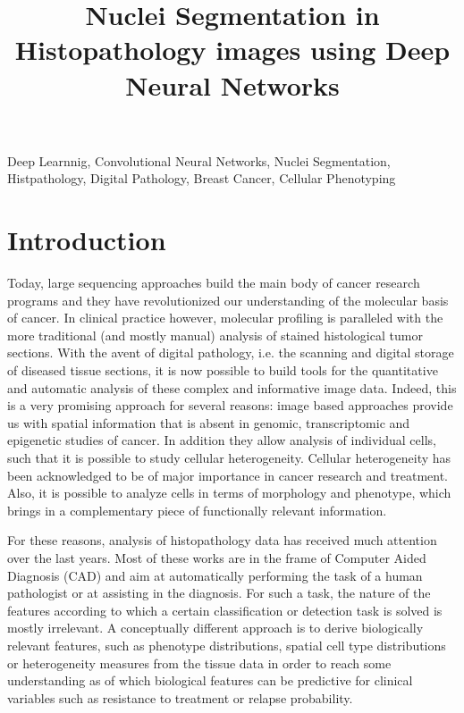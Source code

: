 \documentclass{article}
\title{Nuclei Segmentation in Histopathology
  images using Deep Neural Networks}
\begin{document}
%
\maketitle
%
\begin{abstract}
\end{abstract}
%
\begin{keywords}
Deep Learnnig, Convolutional Neural Networks, Nuclei Segmentation,
Histpathology, Digital Pathology, Breast Cancer, Cellular Phenotyping
\end{keywords}
%
\section{Introduction}
\label{sec:intro}

Today, large sequencing approaches build the main body of cancer
research programs and they have revolutionized our understanding of
the molecular basis of cancer. In clinical practice however,
molecular profiling is paralleled with the more traditional
(and mostly manual) analysis of stained histological tumor
sections. With the avent of digital pathology, i.e. the scanning and
digital storage of diseased tissue sections, it is now possible to
build tools for the quantitative and automatic analysis of these
complex and informative image data. Indeed, this is a very promising
approach for several reasons: image based approaches
provide us with spatial information that is absent in genomic,
transcriptomic and epigenetic studies of cancer. In addition they
allow analysis of individual cells, such that it is possible to study
cellular heterogeneity. Cellular heterogeneity has been acknowledged
to be of major importance in cancer research and treatment. Also, it
is possible to analyze cells in terms of morphology and phenotype,
which brings in a complementary piece of functionally relevant
information.  

For these reasons, analysis of histopathology data has received much
attention over the last years. Most of these works are in the frame of
Computer Aided Diagnosis (CAD) and aim at automatically performing the
task of a human pathologist or at assisting in the diagnosis. For such
a task, the nature of the features according to which a certain
classification or detection task is solved is mostly
irrelevant. A conceptually different approach is to derive biologically
relevant features, such as phenotype distributions, spatial cell type
distributions or heterogeneity measures from the tissue data in order to reach some
understanding as of which biological features can be predictive for
clinical variables such as resistance to treatment or relapse
probability. 
\end{document}
